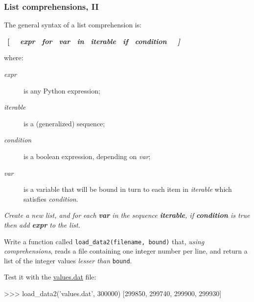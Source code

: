 \documentclass[english,serif,mathserif,xcolor=pdftex,dvipsnames,table]{beamer}
\begin{document}
\begin{frame}[fragile]
  \frametitle{List comprehensions, II}
  \def\e{\ttfamily\itshape}

  The general syntax of a list comprehension is:
  \begin{python}
    ~\bf[~ ~\e expr~ for ~\e var~ in ~\e iterable~ if ~\e condition~ ~\bf]~
  \end{python}
  where:
  \begin{description}
  \item[\e expr] is any Python expression;
  \item[\e iterable] is a (generalized) sequence;
  \item[\e condition] is a boolean expression, depending on
    {\e var};
  \item[\e var] is a variable that will be bound in turn to each item
    in {\e iterable} which satisfies {\e condition}.
  \end{description}

  \+ \textit{Create a new list, and for each \textbf{var} in the
    sequence \textbf{iterable}, if \textbf{condition} is true then add
    \textbf{expr} to the list.}
\end{frame}


\begin{frame}[fragile]
  \begin{exercise}
    Write a function called \texttt{load\_data2(filename, bound)}
    that, \textit{using comprehensions}, reads a file containing one
    integer number per line, and return a list of the integer values
    \textit{lesser than} \texttt{bound}.

    \+
    Test it with the
    \href{https://raw.github.com/gc3-uzh-ch/python-course/master/values.dat}{values.dat}
    file:
    \begin{python}
>>> load_data2('values.dat', 300000)
[299850, 299740, 299900, 299930]
    \end{python}

  \end{exercise}
\end{frame}
\end{document}
